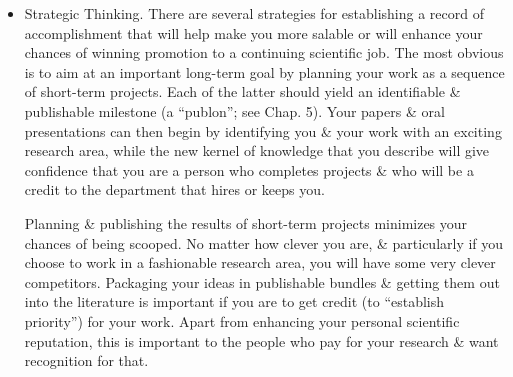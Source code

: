 \documentclass{article}
\begin{document}
\begin{enumerate}
\begin{itemize}
\begin{itemize}
			The people who hired you because of a certain technical expertise may be somewhat to very disappointed when you 1st announce that you will not be spending {\it all} your time working with the synchrotron, scanning tunneling microscope, or whatever. On the other hand, they will not be pleased, some years later, if you have become obsolete along with your particular technique. If \& when you decide you need to branch out or move away from your initial technical role, you must make certain to fulfill your commitments to ongoing projects. Assuming that you do this gracefully, your group's disappointment at your change in technical focus will be tempered as your broadened effort leads you to the solution of an important science problem, enables you to win new research funding, \& maintains or enhances your standing in the research community.
			\item {\sf Strategic Thinking.} There are several strategies for establishing a record of accomplishment that will help make you more salable or will enhance your chances of winning promotion to a continuing scientific job. The most obvious is to aim at an important long-term goal by planning your work as a sequence of short-term projects. Each of the latter should yield an identifiable \& publishable milestone (a ``publon''; see Chap. 5). Your papers \& oral presentations can then begin by identifying you \& your work with an exciting research area, while the new kernel of knowledge that you describe will give confidence that you are a person who completes projects \& who will be a credit to the department that hires or keeps you.

			Planning \& publishing the results of short-term projects minimizes your chances of being scooped. No matter how clever you are, \& particularly if you choose to work in a fashionable research area, you will have some very clever competitors. Packaging your ideas in publishable bundles \& getting them out into the literature is important if you are to get credit (to ``establish priority'') for your work. Apart from enhancing your personal scientific reputation, this is important to the people who pay for your research \& want recognition for that.


\end{itemize}
\end{itemize}
\end{enumerate}
\end{document}
